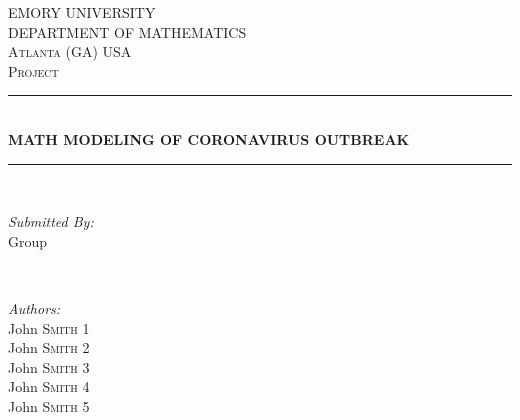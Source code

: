 \begin{titlepage}

\newcommand{\HRule}{\rule{\linewidth}{0.5mm}} %

\newcommand{\Deriv}[3]{\dfrac{\partial^#1 #2}{\partial #3^#1}}

\center %
 

\textsc{\LARGE EMORY UNIVERSITY}\\[0.3cm] %
\textsc{\LARGE DEPARTMENT OF MATHEMATICS  }\\[0.3cm]
\textsc{\Large Atlanta (GA) USA }\\[0.3cm]
\textsc{\Large Project}\\[0.5cm] %


\HRule \\[0.4cm]
{ \large \bfseries MATH MODELING OF CORONAVIRUS OUTBREAK}\\[0.03cm] %
\HRule \\[1.5cm]

 

\begin{minipage}{0.4\textwidth}
\begin{flushleft} \large
\emph{Submitted By:} \\
Group  \\ %
\end{flushleft}
\end{minipage}
~
\begin{minipage}{0.4\textwidth}
\begin{flushright} 
\small \emph{Authors:}\\[0.3cm]
John \textsc{Smith 1}\\[0.3cm] %
John \textsc{Smith 2}\\[0.3cm] %
John \textsc{Smith 3}\\[0.3cm] %
John \textsc{Smith 4}\\[0.3cm] %
John \textsc{Smith 5}\\[0.3cm] %
\end{flushright}
\end{minipage}\\[1cm]


\end{titlepage}
